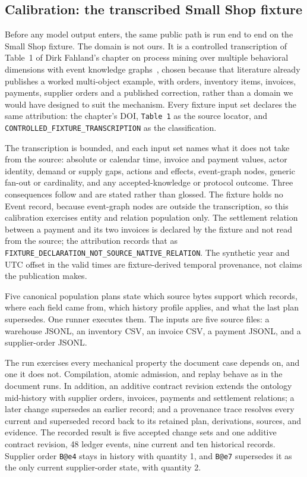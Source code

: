 \documentclass[10pt]{article}
\newcommand{\code}[1]{\texttt{#1}}
\begin{document}
\subsection{Calibration: the transcribed Small Shop fixture}
\label{sec:calibration}

Before any model output enters, the same public path is run end to end on the Small Shop fixture. The domain is not ours. It is a controlled transcription of Table~1 of Dirk Fahland's chapter on process mining over multiple behavioral dimensions with event knowledge graphs~\citep{fahland2022ekg}, chosen because that literature already publishes a worked multi-object example, with orders, inventory items, invoices, payments, supplier orders and a published correction, rather than a domain we would have designed to suit the mechanism. Every fixture input set declares the same attribution: the chapter's DOI, \code{Table 1} as the source locator, and \code{CONTROLLED\_FIXTURE\_TRANSCRIPTION} as the classification.

The transcription is bounded, and each input set names what it does not take from the source: absolute or calendar time, invoice and payment values, actor identity, demand or supply gaps, actions and effects, event-graph nodes, generic fan-out or cardinality, and any accepted-knowledge or protocol outcome. Three consequences follow and are stated rather than glossed. The fixture holds no Event record, because event-graph nodes are outside the transcription, so this calibration exercises entity and relation population only. The settlement relation between a payment and its two invoices is declared by the fixture and not read from the source; the attribution records that as \code{FIXTURE\_DECLARATION\_NOT\_SOURCE\_NATIVE\_RELATION}. The synthetic year and UTC offset in the valid times are fixture-derived temporal provenance, not claims the publication makes.

Five canonical population plans state which source bytes support which records, where each field came from, which history profile applies, and what the last plan supersedes. One runner executes them. The inputs are five source files: a warehouse JSONL, an inventory CSV, an invoice CSV, a payment JSONL, and a supplier-order JSONL.

The run exercises every mechanical property the document case depends on, and one it does not. Compilation, atomic admission, and replay behave as in the document runs. In addition, an additive contract revision extends the ontology mid-history with supplier orders, invoices, payments and settlement relations; a later change supersedes an earlier record; and a provenance trace resolves every current and superseded record back to its retained plan, derivations, sources, and evidence. The recorded result is five accepted change sets and one additive contract revision, 48 ledger events, nine current and ten historical records. Supplier order \code{B@e4} stays in history with quantity 1, and \code{B@e7} supersedes it as the only current supplier-order state, with quantity 2.
\end{document}

